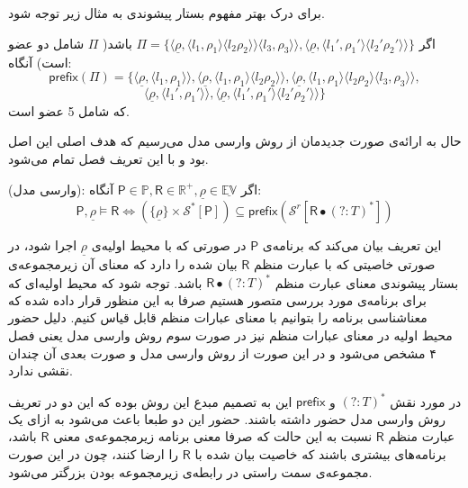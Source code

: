 برای درک بهتر مفهوم بستار پیشوندی به مثال زیر توجه شود.
\begin{exm}
	اگر 
	$\Pi = \{\langle\underline{\rho},\langle l_1 , \rho_1 \rangle 
	\langle l_2  \rho_2 \rangle\rangle  \langle l_3 , \rho_3 \rangle\rangle 
	,
	\langle\underline{\rho},\langle {l_1}' , {\rho_1}' \rangle  \langle {l_2}'  {\rho_2}' \rangle\rangle
	\}$ 
	باشد( $\Pi$ شامل دو عضو است) آنگاه:
	$$
	\mathsf{prefix}(\Pi)=
	\{
	\langle\underline{\rho},\langle l_1 , \rho_1 \rangle\rangle ,
	\langle\underline{\rho},\langle l_1 , \rho_1 \rangle  \langle l_2  \rho_2 \rangle\rangle,
	\langle\underline{\rho},\langle l_1 , \rho_1 \rangle  \langle l_2  \rho_2 \rangle  \langle l_3 , \rho_3 \rangle\rangle ,$$
	$$
	\langle\underline{\rho},\langle {l_1}' , {\rho_1}' \rangle\rangle,
	\langle\underline{\rho},\langle {l_1}' , {\rho_1}' \rangle  \langle {l_2}'  {\rho_2}' \rangle\rangle
	\}
	$$
	که شامل 5 عضو است.
\end{exm}
حال به ارائه‌ی صورت جدیدمان از روش وارسی مدل می‌رسیم که هدف اصلی این اصل بود و با این تعریف فصل تمام می‌شود.
\begin{defn}
(وارسی مدل):
	اگر 
	$\mathsf{P}\in\mathbb{P} , \mathsf{R} \in \mathbb{R}^+ , \underline{\rho} \in \underline{\mathbb{EV}}$
	آنگاه:
	$$\mathsf{P},\underline{\rho} \models \mathsf{R}
	 \Leftrightarrow
	(\{\underline{\rho}\}\times \mathcal{S}^* [\mathsf{P}]) \subseteq 
	\mathsf{prefix} (\mathcal{S}^r [\mathsf{R} \bullet (?:\mathit{T})^*])
	$$
\end{defn}

این تعریف بیان می‌کند که برنامه‌ی 
$\mathsf{P}$
در صورتی که با محیط اولیه‌ی 
$\underline{\rho}$
اجرا شود، در صورتی خاصیتی که با عبارت منظم 
$\mathsf{R}$
بیان شده را دارد که معنای آن زیرمجموعه‌ی بستار پیشوندی معنای عبارت منظم
$\mathsf{R} \bullet (?:\mathit{T})^*$
باشد.
توجه شود که محیط اولیه‌ای که برای برنامه‌ی مورد بررسی متصور هستیم صرفا به این منظور قرار داده شده که معناشناسی برنامه را بتوانیم با معنای عبارات منظم قابل قیاس کنیم. دلیل حضور محیط اولیه در معنای عبارات منظم نیز در صورت سوم روش وارسی مدل یعنی فصل ۴ مشخص می‌شود و در این صورت از روش وارسی مدل و صورت بعدی آن چندان نقشی ندارد. 

در مورد نقش 
$ (?:\mathit{T})^*$
و
$ \mathsf{prefix} $
این به تصمیم مبدع این روش بوده که این دو در تعریف روش وارسی مدل حضور داشته باشند. حضور این دو طبعا باعث می‌شود به ازای یک عبارت منظم 
$\mathsf{R}$
نسبت به این حالت که صرفا معنی برنامه زیرمجموعه‌ی معنی 
$\mathsf{R}$
باشد، برنامه‌های بیشتری باشند که خاصیت بیان شده با 
$\mathsf{R}$
را ارضا کنند، چون در این صورت مجموعه‌ی سمت راستی در رابطه‌ی زیرمجموعه بودن بزرگتر می‌شود.

